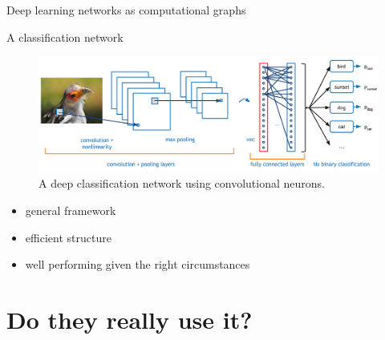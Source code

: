 \documentclass[10pt]{beamer}
\begin{document}
\begin{frame}{Deep learning networks as computational graphs}
{\begin{figure}
	\end{figure}}
\end{frame}

\begin{frame}{A classification network}
	\begin{figure}
		\centering
		\includegraphics[width=\linewidth]{deeplearning-intro-ml}
		\caption{A deep classification network using convolutional neurons.}
	\end{figure}
	\begin{itemize}
		\item<3-> general framework
		\item<4-> efficient structure
		\item<5-> well performing given the right circumstances
	\end{itemize}
\end{frame}

\section{Do they really use it?}
\end{document}
